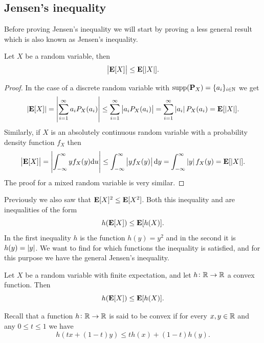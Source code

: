 \documentclass[11pt,a4paper]{article}
\begin{document}
\subsection{Jensen's inequality}
\begin{remark}
  Before proving Jensen's inequality we will start by proving a less
  general result which is also known as Jensen's inequality.
\end{remark}
\begin{proposition}
  \label{prop:jensen-special-case}
  Let $X$ be a random variable, then
  \[
    \left\lvert\mathbf{E}[X]\right\rvert \le \mathbf{E}[|X|].
  \]
\end{proposition}
\begin{proof}
In the case of a discrete random variable with 
$\operatorname{supp}(\mathbf{P}_X) = \{a_i\}_{i \in \mathbb{N}}$ we get
  \[
    |\mathbf{E}[X]|=
    \left\lvert\sum_{i=1}^{\infty} a_{i} P_{X}(a_{i})\right\rvert \leq
    \sum_{i=1}^{\infty} \left\lvert a_{i} P_{X}(a_{i})\right\rvert =
    \sum_{i=1}^{\infty} \left\lvert a_{i}\right\rvert P_{X}(a_{i}) =
    \mathbf{E}[|X|].
  \]
  Similarly, if $X$ is an absolutely continuous random variable with
  a probability density function $f_X$ then
  \[
    \abs{\E[X]} =
    \abs{\int_{-\infty}^{\infty} y f_{X}(y) \du} \leq
    \int_{-\infty}^{\infty} \abs{y f_{X}(y)} \dy =
    \int_{-\infty}^{\infty} \abs{y} f_{X}(y) =
    \E[|X|].
  \]
  The proof for a mixed random variable is very similar.
\end{proof}

\begin{remark}
  Previously we also saw that $\mathbf{E}[X]^{2} \leq \mathbf{E}[X^{2}]$.
  Both this inequality and 
  are inequalities of the form
  \[
    h(\mathbf{E}[X]) \le \mathbf{E}[h(X)].
  \]
  In the first inequality $h$ is the function $h(y) = y^2$ and
  in the second it is $h(y) = \left\lvert y\right\rvert$.
  We want to find for which functions the inequality is satisfied,
  and for this purpose we have the general Jensen's inequality.
\end{remark}

\begin{theorem}
  \label{thm:jensen}
  Let $X$ be a random variable with finite expectation,
  and let $h \colon \mathbb{R} \to \mathbb{R}$ a convex function.
  Then
  \[
    h(\mathbf{E}[X]) \le \mathbf{E}[h(X)].
  \]
\end{theorem}

\begin{remark}
  Recall that a function $h \colon \mathbb{R} \to \mathbb{R}$ is said to be convex if for
  every $x,y \in \mathbb{R}$ and any $0 \le t \le 1$ we have
  \[
    h(t x+(1-t)y)\leq t h(x)+(1-t)h(y).
  \]
\end{remark}
\end{document}
